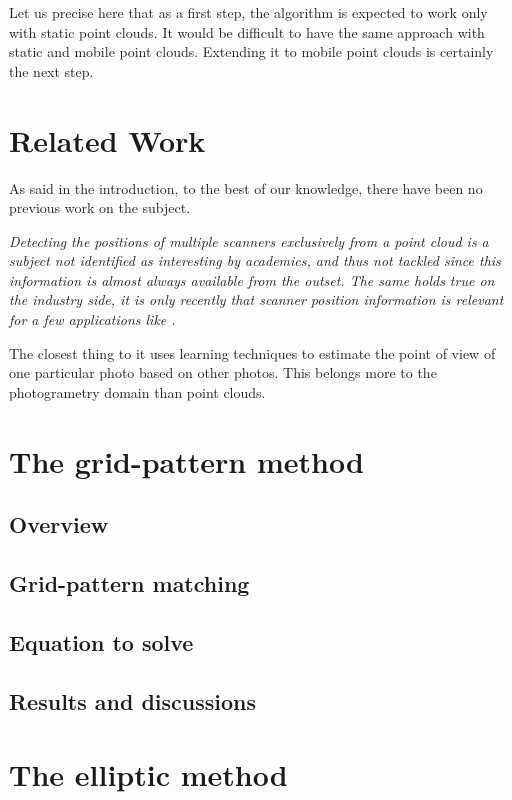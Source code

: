 Let us precise here that as a first step, the algorithm is expected to work only with static point clouds. It would be difficult to have the same approach with static and mobile point clouds. Extending it to mobile point clouds is certainly the next step.


\section{Related Work}
As said in the introduction, to the best of our knowledge, there have been no previous work on the subject.

\emph{Detecting the positions of multiple scanners exclusively from a point cloud is a subject not identified as interesting by academics, and thus not tackled since this information is almost always available from the outset. The same holds true on the industry side, it is only recently that scanner position information is relevant for a few applications like \CC.}

The closest thing to it uses learning techniques to estimate the point of view of one particular photo based on other photos. This belongs more to the photogrametry domain than point clouds.


\section{The grid-pattern method}


\subsection{Overview}


\subsection{Grid-pattern matching}


\subsection{Equation to solve}


\subsection{Results and discussions}



\section{The elliptic method}


